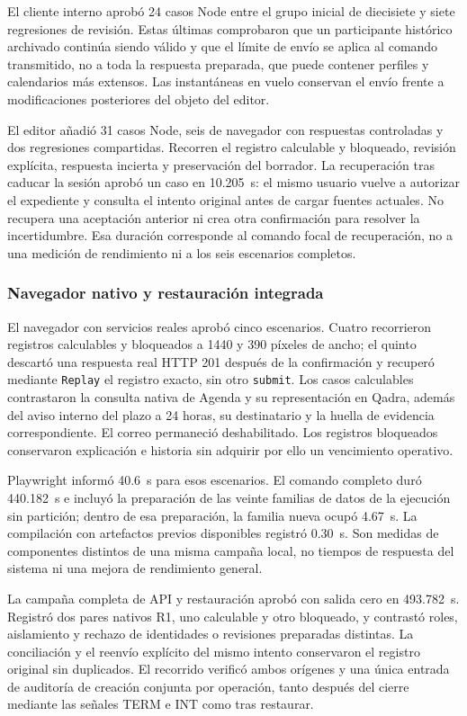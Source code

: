 El cliente interno aprobó 24 casos Node entre el grupo inicial de diecisiete y siete regresiones de revisión. Estas últimas comprobaron que un participante histórico archivado continúa siendo válido y que el límite de envío se aplica al comando transmitido, no a toda la respuesta preparada, que puede contener perfiles y calendarios más extensos. Las instantáneas en vuelo conservan el envío frente a modificaciones posteriores del objeto del editor.

El editor añadió 31 casos Node, seis de navegador con respuestas controladas y dos regresiones compartidas. Recorren el registro calculable y bloqueado, revisión explícita, respuesta incierta y preservación del borrador. La recuperación tras caducar la sesión aprobó un caso en 10.205~s: el mismo usuario vuelve a autorizar el expediente y consulta el intento original antes de cargar fuentes actuales. No recupera una aceptación anterior ni crea otra confirmación para resolver la incertidumbre. Esa duración corresponde al comando focal de recuperación, no a una medición de rendimiento ni a los seis escenarios completos.

\subsubsection{Navegador nativo y restauración integrada}

El navegador con servicios reales aprobó cinco escenarios. Cuatro recorrieron registros calculables y bloqueados a 1440 y 390 píxeles de ancho; el quinto descartó una respuesta real HTTP 201 después de la confirmación y recuperó mediante \texttt{Replay} el registro exacto, sin otro \texttt{submit}. Los casos calculables contrastaron la consulta nativa de Agenda y su representación en Qadra, además del aviso interno del plazo a 24 horas, su destinatario y la huella de evidencia correspondiente. El correo permaneció deshabilitado. Los registros bloqueados conservaron explicación e historia sin adquirir por ello un vencimiento operativo.

Playwright informó 40.6~s para esos escenarios. El comando completo duró 440.182~s e incluyó la preparación de las veinte familias de datos de la ejecución sin partición; dentro de esa preparación, la familia nueva ocupó 4.67~s. La compilación con artefactos previos disponibles registró 0.30~s. Son medidas de componentes distintos de una misma campaña local, no tiempos de respuesta del sistema ni una mejora de rendimiento general.

La campaña completa de API y restauración aprobó con salida cero en 493.782~s. Registró dos pares nativos R1, uno calculable y otro bloqueado, y contrastó roles, aislamiento y rechazo de identidades o revisiones preparadas distintas. La conciliación y el reenvío explícito del mismo intento conservaron el registro original sin duplicados. El recorrido verificó ambos orígenes y una única entrada de auditoría de creación conjunta por operación, tanto después del cierre mediante las señales TERM e INT como tras restaurar.

